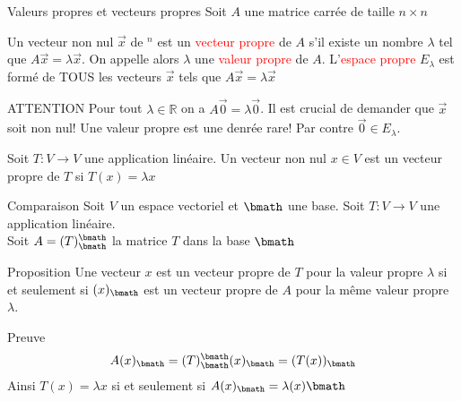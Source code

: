 \begin{parag}{Valeurs propres et vecteurs propres}
Soit $A$ une matrice carrée de taille $n \times n$
    \begin{definition}
        Un vecteur non nul $\vec{x}$ de \R$^n$ est un \textcolor{red}{vecteur propre} de $A$ s'il existe un nombre $\lambda$ tel que $A\vec{x} = \lambda \vec{x}$. On appelle alors $\lambda$ une \textcolor{red}{valeur propre} de $A$. L'\textcolor{red}{espace propre} $E_\lambda$ est formé de TOUS les vecteurs $\vec{x}$ tels que $A\vec{x} = \lambda\vec{x}$
    \end{definition}
    \begin{subparag}{ATTENTION}
        Pour tout $\lambda \in \mathbb{R}$ on a $A\vec{0} = \lambda \vec{0}$. Il est crucial de demander que $\vec{x}$ soit non nul! Une valeur propre est une denrée rare! Par contre $\vec{0} \in E_\lambda$.
    \end{subparag}

    \begin{definition}
        Soit $T : V \to V$ une application linéaire. Un vecteur non nul $x \in V$ est un vecteur propre de $T$ si $T(x) = \lambda x$
    \end{definition}

    \begin{subparag}{Comparaison}
        Soit $V$ un espace vectoriel et $\bmath$ une base. Soit $T: V \to V$ une application linéaire.
        \\
        Soit $A = (T)_\bmath^\bmath$ la matrice $T$ dans la base $\bmath$

    \end{subparag}


    \begin{subparag}{Proposition}
        Une vecteur $x$ est un vecteur propre de $T$ pour la valeur propre $\lambda$ si et seulement si $(x)_\bmath$ est un vecteur propre de $A$ pour la même valeur propre $\lambda$.
        \end{subparag}
    \begin{subparag}{Preuve}
        \[A(x)_\bmath = (T)_\bmath^\bmath(x)_\bmath = (T(x))_\bmath\]
        Ainsi $T(x) = \lambda x$ si et seulement si $A(x)_\bmath = \lambda(x)\bmath$
    \end{subparag}


\end{parag}
